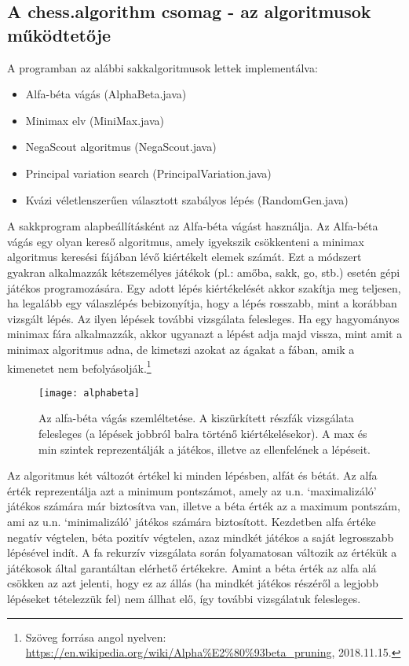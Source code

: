\documentclass[../documentation.tex]{subfiles}
\begin{document}
\subsection{A chess.algorithm csomag - az algoritmusok működtetője}
A programban az alábbi sakkalgoritmusok lettek implementálva:
\begin{itemize}
	\item Alfa-béta vágás (AlphaBeta.java)
	\item Minimax elv (MiniMax.java)
	\item NegaScout algoritmus (NegaScout.java)
	\item Principal variation search (PrincipalVariation.java)
	\item Kvázi véletlenszerűen választott szabályos lépés (RandomGen.java)
\end{itemize}

A sakkprogram alapbeállításként az Alfa-béta vágást használja. Az Alfa-béta vágás egy olyan kereső algoritmus, amely igyekszik csökkenteni a minimax algoritmus keresési fájában lévő kiértékelt elemek számát. Ezt a módszert gyakran alkalmazzák kétszemélyes játékok (pl.: amőba, sakk, go, stb.) esetén gépi játékos programozására. Egy adott lépés kiértékelését akkor szakítja meg teljesen, ha legalább egy válaszlépés bebizonyítja, hogy a lépés rosszabb, mint a korábban vizsgált lépés. Az ilyen lépések további vizsgálata felesleges. Ha egy hagyományos minimax fára alkalmazzák, akkor ugyanazt a lépést adja majd vissza, mint amit a minimax algoritmus adna, de kimetszi azokat az ágakat a fában, amik a kimenetet nem befolyásolják.\footnote{Szöveg forrása angol nyelven: \url{https://en.wikipedia.org/wiki/Alpha\%E2\%80\%93beta\_pruning}, 2018.11.15.}

\begin{figure}[h]
\centering
\texttt{[image: alphabeta]}
\caption{Az alfa-béta vágás szemléltetése. A kiszürkített részfák vizsgálata felesleges (a lépések jobbról balra történő kiértékelésekor). A max és min szintek reprezentálják a játékos, illetve az ellenfelének a lépéseit. \protect\footnotemark}
\label{fig:alphabeta}
\end{figure}

Az algoritmus két változót értékel ki minden lépésben, alfát és bétát. Az alfa érték reprezentálja azt a minimum pontszámot, amely az u.n. `maximalizáló' játékos számára már biztosítva van, illetve a béta érték az a maximum pontszám, ami az u.n. `minimalizáló' játékos számára biztosított. Kezdetben alfa értéke negatív végtelen, béta pozitív végtelen, azaz mindkét játékos a saját legrosszabb lépésével indít. A fa rekurzív vizsgálata során folyamatosan változik az értékük a játékosok által garantáltan elérhető értékekre. Amint a béta érték az alfa alá csökken az azt jelenti, hogy ez az állás (ha mindkét játékos részéről a legjobb lépéseket tételezzük fel) nem állhat elő, így további vizsgálatuk felesleges.
\end{document}
